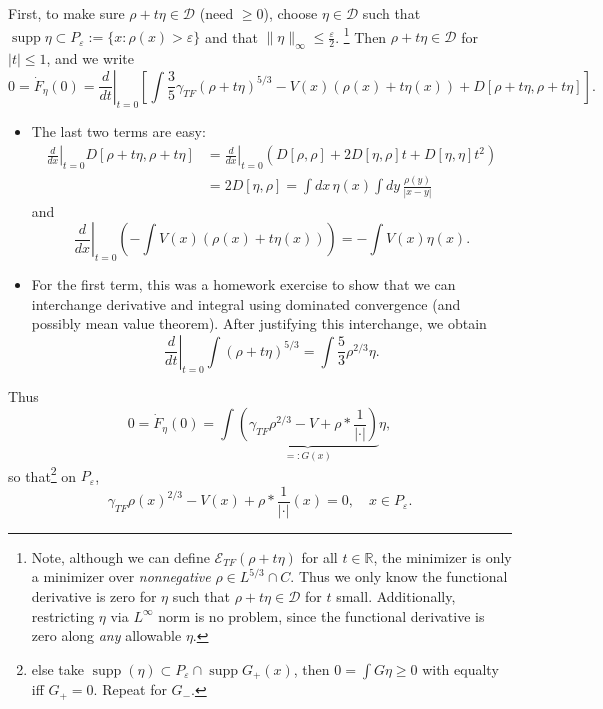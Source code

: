 \documentclass[11pt]{amsart}
\newcommand{\R}{\mathbb{R}}
\theoremstyle{definition}
\theoremstyle{definition}
\theoremstyle{definition}
\numberwithin{equation}{section}
\begin{document}
First, to make sure $\rho+t\eta\in\mathcal{D}$ (need $\ge0$), choose $\eta\in\mathcal{D}$ such that $\operatorname{supp}\eta\subset P_\varepsilon:=\{x:\rho(x)>\varepsilon\}$ and that $\|\eta\|_\infty\le\frac{\varepsilon}{2}$. \footnote{Note, although we can define $\mathcal{E}_{TF}(\rho+t\eta)$ for all $t\in\R$, the minimizer is only a minimizer over \emph{nonnegative} $\rho\in L^{5/3}\cap C$. Thus we only know the functional derivative is zero for $\eta$ such that $\rho+t\eta\in\mathcal{D}$ for $t$ small. Additionally, restricting $\eta$ via $L^\infty$ norm is no problem, since the functional derivative is zero along \emph{any} allowable $\eta$.}
Then $\rho+t\eta\in\mathcal{D}$ for $|t|\le1$, and we write
\begin{equation}
0=\dot{F}_\eta(0)=\left.\frac{d}{dt}\right|_{t=0}\left[\int\frac{3}{5}\gamma_{TF}(\rho+t\eta)^{5/3}-V(x)(\rho(x)+t\eta(x))+D[\rho+t\eta,\rho+t\eta]\right].
\end{equation}
\begin{itemize}
\item The last two terms are easy:
\begin{align*}
\left.\frac{d}{dx}\right|_{t=0}D[\rho+t\eta,\rho+t\eta]&=\left.\frac{d}{dx}\right|_{t=0}(D[\rho,\rho]+2D[\eta,\rho]t+D[\eta,\eta]t^2)\\
&=2D[\eta,\rho]=\int dx\,\eta(x)\int dy\,\frac{\rho(y)}{|x-y|}
\end{align*}
and
\[
\left.\frac{d}{dx}\right|_{t=0}\left(-\int V(x)(\rho(x)+t\eta(x))\right)=-\int V(x)\eta(x).
\]
\item For the first term, this was a homework exercise to show that we can interchange derivative and integral using dominated convergence (and possibly mean value theorem). After justifying this interchange, we obtain
\[
\left.\frac{d}{dt}\right|_{t=0}\int(\rho+t\eta)^{5/3}=\int\frac{5}{3}\rho^{2/3}\eta.
\]
\end{itemize}
Thus
\begin{equation*}
0=\dot{F}_\eta(0)=\int\underbrace{\left(\gamma_{TF}\rho^{2/3}-V+\rho*\frac{1}{|\cdot|}\right)}_{=:G(x)}\eta,
\end{equation*}
so that\footnote{else take $\operatorname{supp}(\eta)\subset P_\varepsilon\cap\operatorname{supp}G_+(x)$, then $0=\int G\eta\ge0$ with equalty iff $G_+=0$. Repeat for $G_-$.} on $P_\varepsilon$,
\begin{equation}
\gamma_{TF}\rho(x)^{2/3}-V(x)+\rho*\frac{1}{|\cdot|}(x)=0,\quad x\in P_\varepsilon.
\end{equation}
\end{document}
